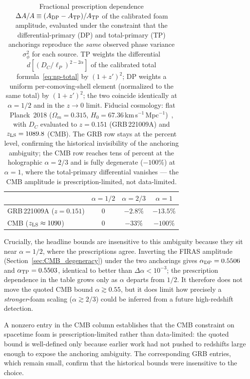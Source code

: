 \documentclass[aps,prd,onecolumn,amsmath,amssymb]{revtex4-2}
\begin{document}
\begin{table}[h]
\caption{Fractional prescription dependence
$\Delta A/A\equiv(A_{\rm DP}-A_{\rm TP})/A_{\rm TP}$ of the calibrated foam
amplitude, evaluated under the constraint that the differential-primary (DP)
and total-primary (TP) anchorings reproduce the \emph{same} observed phase
variance $\sigma_\phi^2$ for each source.  TP weights the differential
$d[(D_C/\ell_P)^{2-2\alpha}]$ of the calibrated total
formula~\eqref{eq:np-total} by $(1+z')^2$; DP weights a uniform
per-comoving-shell element (normalized to the same total) by $(1+z')^2$; the
two coincide identically at $\alpha=1/2$ and in the $z\to0$ limit.  Fiducial
cosmology: flat Planck~2018 ($\Omega_m=0.315$,
$H_0=67.36$\,km\,s$^{-1}$\,Mpc$^{-1}$)~\cite{Aghanim2020}, with $D_C$ evaluated
to $z=0.151$ (GRB\,221009A) and $z_{\rm LS}=1089.8$ (CMB).  The GRB row stays
at the percent level, confirming the historical invisibility of the anchoring
ambiguity; the CMB row reaches tens of percent at the holographic $\alpha=2/3$
and is fully degenerate ($-100\%$) at $\alpha=1$, where the total-primary
differential vanishes --- the CMB amplitude is prescription-limited, not
data-limited.}
\label{tab:prescription}
\begin{ruledtabular}
\begin{tabular}{lccc}
 & $\alpha=1/2$ & $\alpha=2/3$ & $\alpha=1$ \\
\hline
GRB\,221009A ($z=0.151$)      & $0$ & $-2.8\%$ & $-13.5\%$ \\
CMB ($z_{\rm LS}\approx1090$) & $0$ & $-33\%$  & $-100\%$ \\
\end{tabular}
\end{ruledtabular}
\end{table}

Crucially, the headline bounds are insensitive to this ambiguity because they
sit near $\alpha=1/2$, where the prescriptions agree.  Inverting the FIRAS
amplitude (Section~\ref{sec:CMB_degeneracy}) under the two anchorings gives
$\alpha_{\rm DP}=0.5506$ and $\alpha_{\rm TP}=0.5503$, identical to better than
$\Delta\alpha<10^{-3}$; the prescription dependence in the table grows only as
$\alpha$ departs from $1/2$.  It therefore does not move the quoted CMB bound
$\alpha\gtrsim0.55$, but it does limit how precisely a \emph{stronger}-foam
scaling ($\alpha\gtrsim2/3$) could be inferred from a future high-redshift
detection.

A nonzero entry in the CMB column establishes that the CMB constraint on
spacetime foam is prescription-limited rather than data-limited: the quoted
bound is well-defined only because earlier work had not pushed to redshifts
large enough to expose the anchoring ambiguity. The corresponding GRB entries,
which remain small, confirm that the historical bounds were insensitive to the
choice.
\end{document}
